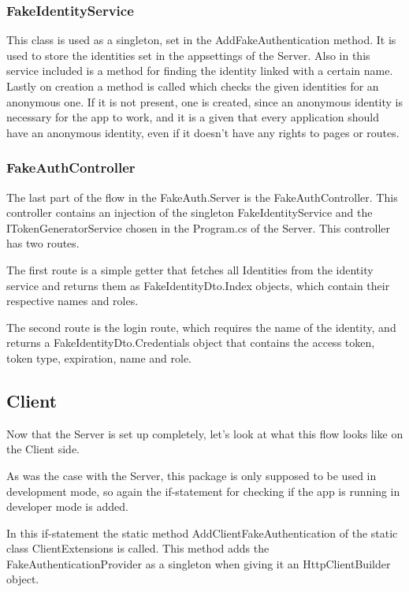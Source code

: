 \subsubsection{FakeIdentityService}

This class is used as a singleton, set in the AddFakeAuthentication method. It is used to store the identities set in the appsettings of the Server. Also in this service included is a method for finding the identity linked with a certain name. Lastly on creation a method is called which checks the given identities for an anonymous one. If it is not present, one is created, since an anonymous identity is necessary for the app to work, and it is a given that every application should have an anonymous identity, even if it doesn't have any rights to pages or routes.

\subsubsection{FakeAuthController}

The last part of the flow in the FakeAuth.Server is the FakeAuthController. This controller contains an injection of the singleton FakeIdentityService and the ITokenGeneratorService chosen in the Program.cs of the Server. This controller has two routes.

The first route is a simple getter that fetches all Identities from the identity service and returns them as FakeIdentityDto.Index objects, which contain their respective names and roles.

The second route is the login route, which requires the name of the identity, and returns a FakeIdentityDto.Credentials object that contains the access token, token type, expiration, name and role.

\subsection{Client}

Now that the Server is set up completely, let's look at what this flow looks like on the Client side.

As was the case with the Server, this package is only supposed to be used in development mode, so again the if-statement for checking if the app is running in developer mode is added.

In this if-statement the static method AddClientFakeAuthentication of the static class ClientExtensions is called. This method adds the FakeAuthenticationProvider as a singleton when giving it an HttpClientBuilder object.

